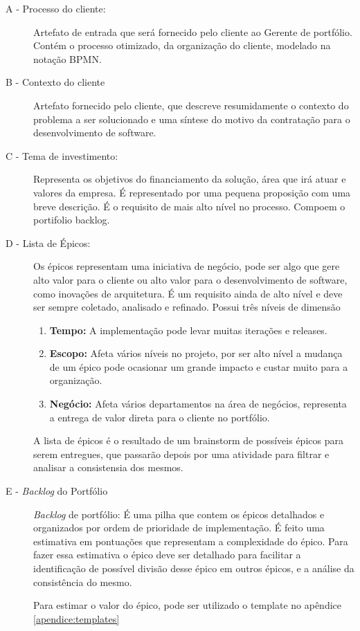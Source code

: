 \begin{description}
  \item[A - Processo do cliente:]
  Artefato de entrada que será fornecido pelo cliente ao Gerente de portfólio.
  Contém o processo otimizado, da organização do cliente, modelado na notação BPMN.\cite{BPMN}
  \item [B - Contexto do cliente]
  Artefato fornecido pelo cliente, que descreve resumidamente o contexto do problema
  a ser solucionado e uma síntese do motivo da contratação para o desenvolvimento de software.
  \item [C - Tema de investimento: ]
  Representa os objetivos do financiamento da solução, área que irá atuar e valores da empresa.
  É representado por uma pequena proposição com uma breve descrição. É o requisito de
  mais alto nível no processo. Compoem o portifolio backlog.\cite{themes}
  \item [D - Lista de Épicos:]
  Os épicos representam uma iniciativa de negócio, pode ser algo que gere alto valor
  para o cliente ou alto valor para o desenvolvimento de software, como inovações de arquitetura.
  É um requisito ainda de alto nível e deve ser sempre coletado, analisado e refinado.
  Possui três níveis de dimensão
    \begin{enumerate}
      \item \textbf{Tempo: } A implementação pode levar muitas iterações e releases.
      \item \textbf{Escopo: } Afeta vários níveis no projeto, por ser alto nível a mudança
      de um épico pode ocasionar um grande impacto e custar muito para a organização.
      \item \textbf{Negócio: } Afeta vários departamentos na área de negócios, representa
      a entrega de valor direta para o cliente no portfólio.
    \end{enumerate}
  A lista de épicos é o resultado de um brainstorm de possíveis épicos para serem entregues,
  que passarão depois por uma atividade para filtrar e analisar a consistensia dos mesmos.
  \item [E - \textit{Backlog} do Portfólio]
  \textit{Backlog} de portfólio: É uma pilha que contem os épicos detalhados e organizados
  por ordem de prioridade de implementação. É feito uma estimativa em pontuações
  que representam a complexidade do épico. Para fazer essa estimativa o épico deve
  ser detalhado para facilitar a identificação de possível divisão desse épico em
  outros épicos, e a análise da consistência do mesmo.\cite{epics}

  Para estimar o valor do épico, pode ser utilizado o template no apêndice \ref{apendice:templates}
\end{description}

